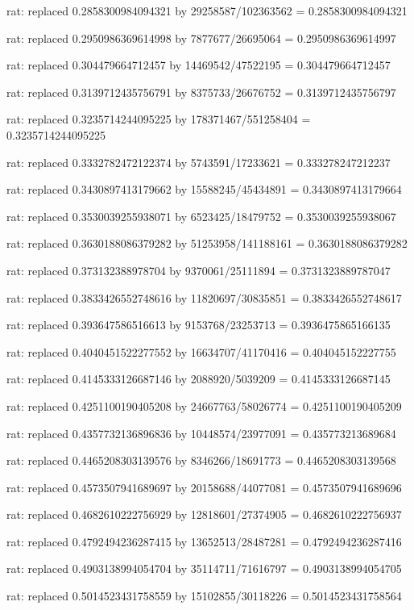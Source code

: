 \documentclass[a4paper,10pt]{article}
\begin{document}
\begin{eulernotebook}
\begin{eulercomment}
\begin{eulercomment}
\begin{eulercomment}
\begin{eulercomment}
\begin{eulercomment}
\begin{eulercomment}
\begin{eulercomment}
\begin{eulercomment}
\begin{eulercomment}
\begin{eulercomment}
\begin{eulercomment}
\begin{eulercomment}
\begin{eulercomment}
\begin{eulercomment}
\begin{eulercomment}
\begin{eulercomment}
\begin{euleroutput}
  rat: replaced 0.2858300984094321 by 29258587/102363562 = 0.2858300984094321
  
  rat: replaced 0.2950986369614998 by 7877677/26695064 = 0.2950986369614997
  
  rat: replaced 0.304479664712457 by 14469542/47522195 = 0.304479664712457
  
  rat: replaced 0.3139712435756791 by 8375733/26676752 = 0.3139712435756797
  
  rat: replaced 0.3235714244095225 by 178371467/551258404 = 0.3235714244095225
  
  rat: replaced 0.3332782472122374 by 5743591/17233621 = 0.333278247212237
  
  rat: replaced 0.3430897413179662 by 15588245/45434891 = 0.3430897413179664
  
  rat: replaced 0.3530039255938071 by 6523425/18479752 = 0.3530039255938067
  
  rat: replaced 0.3630188086379282 by 51253958/141188161 = 0.3630188086379282
  
  rat: replaced 0.373132388978704 by 9370061/25111894 = 0.3731323889787047
  
  rat: replaced 0.3833426552748616 by 11820697/30835851 = 0.3833426552748617
  
  rat: replaced 0.393647586516613 by 9153768/23253713 = 0.3936475865166135
  
  rat: replaced 0.4040451522277552 by 16634707/41170416 = 0.404045152227755
  
  rat: replaced 0.4145333126687146 by 2088920/5039209 = 0.4145333126687145
  
  rat: replaced 0.4251100190405208 by 24667763/58026774 = 0.4251100190405209
  
  rat: replaced 0.4357732136896836 by 10448574/23977091 = 0.435773213689684
  
  rat: replaced 0.4465208303139576 by 8346266/18691773 = 0.4465208303139568
  
  rat: replaced 0.4573507941689697 by 20158688/44077081 = 0.4573507941689696
  
  rat: replaced 0.4682610222756929 by 12818601/27374905 = 0.4682610222756937
  
  rat: replaced 0.4792494236287415 by 13652513/28487281 = 0.4792494236287416
  
  rat: replaced 0.4903138994054704 by 35114711/71616797 = 0.4903138994054705
  
  rat: replaced 0.5014523431758559 by 15102855/30118226 = 0.5014523431758564
  

\end{euleroutput}
\end{eulercomment}
\end{eulercomment}
\end{eulercomment}
\end{eulercomment}
\end{eulercomment}
\end{eulercomment}
\end{eulercomment}
\end{eulercomment}
\end{eulercomment}
\end{eulercomment}
\end{eulercomment}
\end{eulercomment}
\end{eulercomment}
\end{eulercomment}
\end{eulercomment}
\end{eulercomment}
\end{eulernotebook}
\end{document}
